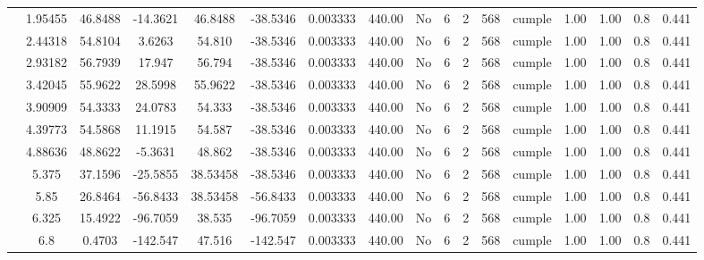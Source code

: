 \begin{table}[H]
{\begin{tabular}{|c|c|c|c|c|c|c|c|c|c|c|c|c|c|c|c|c|}
\cline{2-17}    & 1.95455 & 46.8488 & -14.3621 & 46.8488 & -38.5346 & 0.003333 & 440.00 & No  & 6   & 2   & 568 & \cellcolor[rgb]{ .776,  .937,  .808}cumple & 1.00 & 1.00 & 0.8 & 0.441 \bigstrut\\
\cline{2-17}    & 2.44318 & 54.8104 & 3.6263 & 54.810 & -38.5346 & 0.003333 & 440.00 & No  & 6   & 2   & 568 & \cellcolor[rgb]{ .776,  .937,  .808}cumple & 1.00 & 1.00 & 0.8 & 0.441 \bigstrut\\
\cline{2-17}    & 2.93182 & 56.7939 & 17.947 & 56.794 & -38.5346 & 0.003333 & 440.00 & No  & 6   & 2   & 568 & \cellcolor[rgb]{ .776,  .937,  .808}cumple & 1.00 & 1.00 & 0.8 & 0.441 \bigstrut\\
\cline{2-17}    & 3.42045 & 55.9622 & 28.5998 & 55.9622 & -38.5346 & 0.003333 & 440.00 & No  & 6   & 2   & 568 & \cellcolor[rgb]{ .776,  .937,  .808}cumple & 1.00 & 1.00 & 0.8 & 0.441 \bigstrut\\
\cline{2-17}    & 3.90909 & 54.3333 & 24.0783 & 54.333 & -38.5346 & 0.003333 & 440.00 & No  & 6   & 2   & 568 & \cellcolor[rgb]{ .776,  .937,  .808}cumple & 1.00 & 1.00 & 0.8 & 0.441 \bigstrut\\
\cline{2-17}    & 4.39773 & 54.5868 & 11.1915 & 54.587 & -38.5346 & 0.003333 & 440.00 & No  & 6   & 2   & 568 & \cellcolor[rgb]{ .776,  .937,  .808}cumple & 1.00 & 1.00 & 0.8 & 0.441 \bigstrut\\
\cline{2-17}    & 4.88636 & 48.8622 & -5.3631 & 48.862 & -38.5346 & 0.003333 & 440.00 & No  & 6   & 2   & 568 & \cellcolor[rgb]{ .776,  .937,  .808}cumple & 1.00 & 1.00 & 0.8 & 0.441 \bigstrut\\
\cline{2-17}    & 5.375 & 37.1596 & -25.5855 & 38.53458 & -38.5346 & 0.003333 & 440.00 & No  & 6   & 2   & 568 & \cellcolor[rgb]{ .776,  .937,  .808}cumple & 1.00 & 1.00 & 0.8 & 0.441 \bigstrut\\
\cline{2-17}    & 5.85 & 26.8464 & -56.8433 & 38.53458 & -56.8433 & 0.003333 & 440.00 & No  & 6   & 2   & 568 & \cellcolor[rgb]{ .776,  .937,  .808}cumple & 1.00 & 1.00 & 0.8 & 0.441 \bigstrut\\
\cline{2-17}    & 6.325 & 15.4922 & -96.7059 & 38.535 & -96.7059 & 0.003333 & 440.00 & No  & 6   & 2   & 568 & \cellcolor[rgb]{ .776,  .937,  .808}cumple & 1.00 & 1.00 & 0.8 & 0.441 \bigstrut\\
\cline{2-17}    & \cellcolor[rgb]{ .851,  .882,  .949}6.8 & 0.4703 & -142.547 & 47.516 & -142.547 & 0.003333 & 440.00 & No  & 6   & 2   & 568 & \cellcolor[rgb]{ .776,  .937,  .808}cumple & 1.00 & 1.00 & 0.8 & 0.441 \bigstrut\\

\end{tabular}}
\end{table}
